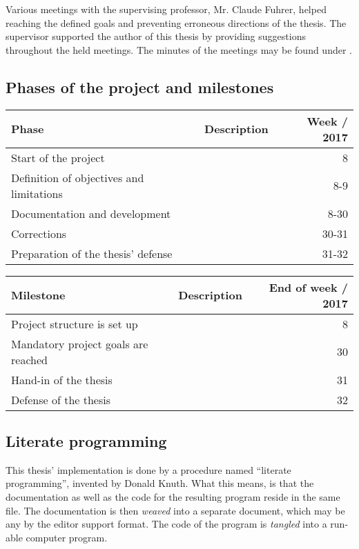 \documentclass[10pt, openright, notitlepage]{scrreprt}
\begin{document}
Various meetings with the supervising professor, Mr. Claude Fuhrer, helped
reaching the defined goals and preventing erroneous directions of the thesis.
The supervisor supported the author of this thesis by providing suggestions
throughout the held meetings. The minutes of the meetings may be found under
\label{org3846b6e}.

\subsection{Phases of the project and milestones}
\label{sec:orga4ad2cc}


\begin{center}
\begin{tabular}{llr}
Phase & Description & Week / 2017\\
\hline
Start of the project &  & 8\\
Definition of objectives and limitations &  & 8-9\\
Documentation and development &  & 8-30\\
Corrections &  & 30-31\\
Preparation of the thesis' defense &  & 31-32\\
\end{tabular}
\end{center}

\begin{center}
\begin{tabular}{llr}
Milestone & Description & End of week / 2017\\
\hline
Project structure is set up &  & 8\\
Mandatory project goals are reached &  & 30\\
Hand-in of the thesis &  & 31\\
Defense of the thesis &  & 32\\
\end{tabular}
\end{center}

\subsection{Literate programming}
\label{sec:org761ae29}

This thesis' implementation is done by a procedure named ``literate
programming'', invented by Donald Knuth. What this means, is that the
documentation as well as the code for the resulting program reside in the same
file. The documentation is then \emph{weaved} into a separate document, which may be
any by the editor support format. The code of the program is \emph{tangled} into a
run-able computer program.
\end{document}
